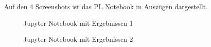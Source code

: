 \documentclass[a4paper]{report}
\begin{document}
Auf den 4 Screenshots ist das PL Notebook in Auszügen dargestellt. 

\begin{figure}[H]
\centering
{}
\caption{Jupyter Notebook mit Ergebnissen 1}
\label{fig:Notebook1}
\end{figure}

\begin{figure}[H]
\centering
{}
\caption{Jupyter Notebook mit Ergebnissen 2}
\label{fig:Notebook2}
\end{figure}
\end{document}
